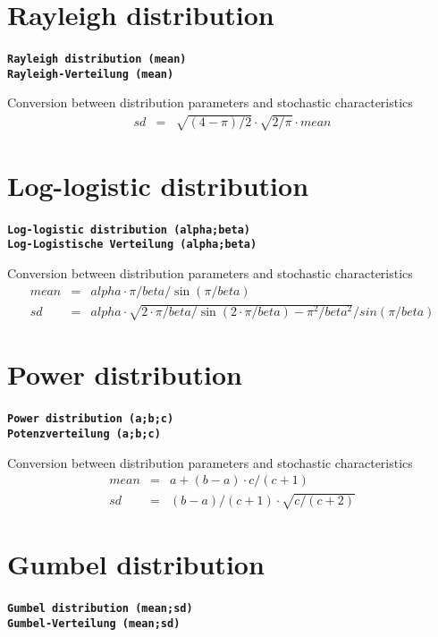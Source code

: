 \documentclass{svmono}
\def\cm#1{\textbf{\texttt{#1}}}
\begin{document}
\section*{Rayleigh distribution}
\cm{Rayleigh distribution (mean)}~\\
\cm{Rayleigh-Verteilung (mean)}

Conversion between distribution parameters and stochastic characteristics
\begin{eqnarray*}
sd&=&\sqrt{(4-\pi)/2}\cdot\sqrt{2/\pi}\cdot mean
\end{eqnarray*}





\section*{Log-logistic distribution}
\cm{Log-logistic distribution (alpha;beta)}~\\
\cm{Log-Logistische Verteilung (alpha;beta)}

Conversion between distribution parameters and stochastic characteristics
\begin{eqnarray*}
mean&=&alpha\cdot\pi/beta/\sin(\pi/beta)\\
sd&=&alpha\cdot\sqrt{2\cdot\pi/beta/\sin(2\cdot\pi/beta)-\pi^2/beta^2}/sin(\pi/beta)
\end{eqnarray*}





\section*{Power distribution}
\cm{Power distribution (a;b;c)}~\\
\cm{Potenzverteilung (a;b;c)}

Conversion between distribution parameters and stochastic characteristics
\begin{eqnarray*}
mean&=&a+(b-a)\cdot c/(c+1)\\
sd&=&(b-a)/(c+1)\cdot\sqrt{c/(c+2)}
\end{eqnarray*}





\section*{Gumbel distribution}
\cm{Gumbel distribution (mean;sd)}~\\
\cm{Gumbel-Verteilung (mean;sd)}
\end{document}
